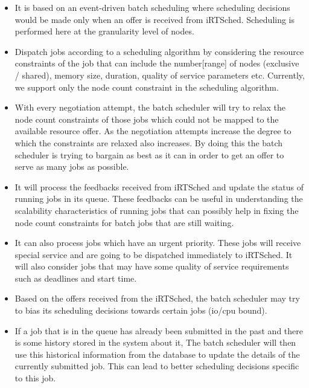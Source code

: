 \begin{itemize}
\item It is based on an event-driven batch scheduling where scheduling decisions would be made only when an offer is received from iRTSched. Scheduling is performed here at the granularity level of nodes.
\item Dispatch jobs according to a scheduling algorithm by considering the resource constraints of the job that can include the number[range] of nodes (exclusive / shared), memory size, duration, quality of service parameters etc. Currently, we support only the node count constraint in the scheduling algorithm.
\item With every negotiation attempt, the batch scheduler will try to relax the node count constraints of those jobs which could not be mapped to the available resource offer. As the negotiation attempts increase the degree to which the constraints are relaxed also increases. By doing this the batch scheduler is trying to bargain as best as it can in order to get an offer to serve as many jobs as possible.
\item It will process the feedbacks received from iRTSched and update the status of running jobs in its queue. These feedbacks can be useful in understanding the scalability characteristics of running jobs that can possibly help in fixing the node count constraints for batch jobs that are still waiting.
\item It can also process jobs which have an urgent priority. These jobs will receive special service and are going to be dispatched immediately to iRTSched. It will also consider jobs that may have some quality of service requirements such as deadlines and start time.
\item Based on the offers received from the iRTSched, the batch scheduler may try to bias its scheduling decisions towards certain jobs (io/cpu bound).
\item If a job that is in the queue has already been submitted in the past and there is some history stored in the system about it, The batch scheduler will then use this historical information from the database to update the details of the currently submitted job. This can lead to better scheduling decisions specific to this job.
\end{itemize}
